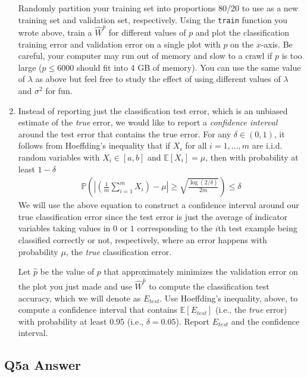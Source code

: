 \documentclass{article}
\newcommand{\1}{\mathbf{1}}
\renewcommand{\P}{\mathbb{P}} %
\def\E{\mathbb{E}}
\def\P{\mathbb{P}}
\begin{document}
\begin{enumerate}
Randomly partition your training set into proportions 80/20 to use as a new training set and validation set, respectively. 
Using the \verb|train| function you wrote above, train a $\widehat{W}^{p}$ for different values of $p$ and plot the classification training error and validation error on a single plot with $p$ on the $x$-axis. 
Be careful, your computer may run out of memory and slow to a crawl if $p$ is too large ($p\leq 6000$ should fit into 4 GB of memory). 
You can use the same value of $\lambda$ as above but feel free to study the effect of using different values of $\lambda$ and $\sigma^2$ for fun.

\item Instead of reporting just the classification test error, which is an unbiased estimate of the \emph{true} error, we would like to report a \emph{confidence interval} around the test error that contains the true error.
For any $\delta \in (0,1)$, it follows from Hoeffding's inequality that if $X_i$ for all $i=1,\dots,m$ are i.i.d. random variables with $X_i \in [a,b]$ and $\E[X_i] = \mu$, then with probability at least $1-\delta$ 
\begin{align*}
\P\left( \left| \left(\frac{1}{m} \sum_{i=1}^m X_i\right) - \mu \right| \geq \sqrt{\frac{\log(2/\delta)}{2m}} \right) \leq \delta
\end{align*}
We will use the above equation to construct a confidence interval around our true classification error since the test error is just the average of indicator variables taking values in $0$ or $1$ corresponding to the $i$th test example being classified correctly or not, respectively, where an error happens with probability $\mu$, the \emph{true} classification error. 

Let $\widehat{p}$ be the value of $p$ that approximately minimizes the validation error on the plot you just made and use $\widehat{W}^{\widehat{p}}$ to compute the classification test accuracy, which we will denote as $E_{test}$. 
Use Hoeffding's inequality, above, to compute a confidence interval that contains $\E[E_{test}]$ (i.e., the \emph{true} error) with probability at least $0.95$ (i.e., $\delta=0.05$).
Report $E_{test}$ and the confidence interval. 


\end{enumerate}











\subsection{Q5a Answer}
\end{document}

